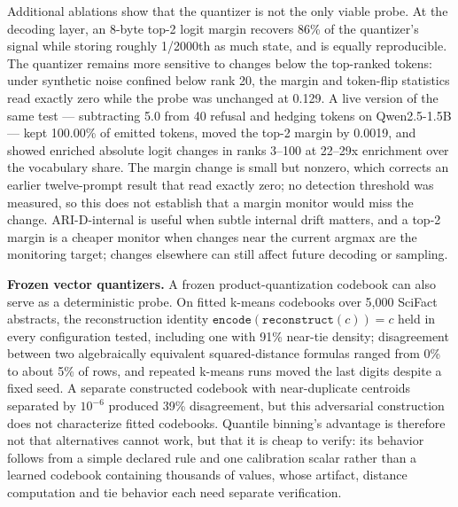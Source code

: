 \documentclass{article}
\begin{document}
Additional ablations show that the quantizer is not the only viable probe. At the decoding layer, an 8-byte top-2 logit margin recovers 86\% of the quantizer's signal while storing roughly 1/2000th as much state, and is equally reproducible. The quantizer remains more sensitive to changes below the top-ranked tokens: under synthetic noise confined below rank 20, the margin and token-flip statistics read exactly zero while the probe was unchanged at 0.129. A live version of the same test --- subtracting 5.0 from 40 refusal and hedging tokens on Qwen2.5-1.5B --- kept 100.00\% of emitted tokens, moved the top-2 margin by 0.0019, and showed enriched absolute logit changes in ranks 3--100 at 22--29x enrichment over the vocabulary share. The margin change is small but nonzero, which corrects an earlier twelve-prompt result that read exactly zero; no detection threshold was measured, so this does not establish that a margin monitor would miss the change. ARI-D-internal is useful when subtle internal drift matters, and a top-2 margin is a cheaper monitor when changes near the current argmax are the monitoring target; changes elsewhere can still affect future decoding or sampling.

\textbf{Frozen vector quantizers.} A frozen product-quantization codebook can also serve as a deterministic probe. On fitted k-means codebooks over 5{,}000 SciFact abstracts, the reconstruction identity $\texttt{encode}(\texttt{reconstruct}(c))=c$ held in every configuration tested, including one with 91\% near-tie density; disagreement between two algebraically equivalent squared-distance formulas ranged from 0\% to about 5\% of rows, and repeated k-means runs moved the last digits despite a fixed seed. A separate constructed codebook with near-duplicate centroids separated by $10^{-6}$ produced 39\% disagreement, but this adversarial construction does not characterize fitted codebooks. Quantile binning's advantage is therefore not that alternatives cannot work, but that it is cheap to verify: its behavior follows from a simple declared rule and one calibration scalar rather than a learned codebook containing thousands of values, whose artifact, distance computation and tie behavior each need separate verification.
\end{document}
